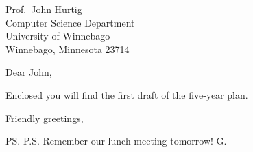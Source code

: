 \documentclass{letter}
\begin{document}
\address{George Gr\"{a}tzer\\
         Department of Mathematics\\
         University of Manitoba\\
         Winnipeg, MB, R3T 2N2\\
         Canada}
\signature{George Gr\"{a}tzer}
\date{}

\begin{letter}{Prof.~John Hurtig\\
               Computer Science Department\\
               University of Winnebago\\
               Winnebago, Minnesota 23714}
\opening{Dear John,}
Enclosed you will find the first draft of the five-year plan.
\closing{Friendly greetings,}
\ps{P.S. Remember our lunch meeting tomorrow! G.}
\end{letter}
\end{document}
